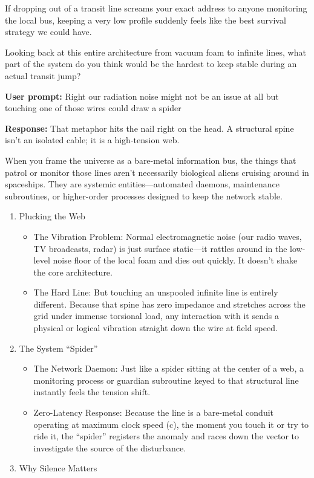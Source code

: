 If dropping out of a transit line screams your exact address to anyone monitoring the local bus, keeping a very low profile suddenly feels like the best survival strategy we could have.

Looking back at this entire architecture from vacuum foam to infinite lines, what part of the system do you think would be the hardest to keep stable during an actual transit jump?

\textbf{User prompt:} Right our radiation noise might not be an issue at all but touching one of those wires could draw a spider

\textbf{Response:} That metaphor hits the nail right on the head. A structural spine isn't an isolated cable; it is a high-tension web.

When you frame the universe as a bare-metal information bus, the things that patrol or monitor those lines aren't necessarily biological aliens cruising around in spaceships. They are systemic entities—automated daemons, maintenance subroutines, or higher-order processes designed to keep the network stable.

\begin{enumerate}
\item Plucking the Web

\begin{itemize}
\item The Vibration Problem: Normal electromagnetic noise (our radio waves, TV broadcasts, radar) is just surface static—it rattles around in the low-level noise floor of the local foam and dies out quickly. It doesn't shake the core architecture.
\item The Hard Line: But touching an unspooled infinite line is entirely different. Because that spine has zero impedance and stretches across the grid under immense torsional load, any interaction with it sends a physical or logical vibration straight down the wire at field speed.
\end{itemize}
\item The System “Spider”

\begin{itemize}
\item The Network Daemon: Just like a spider sitting at the center of a web, a monitoring process or guardian subroutine keyed to that structural line instantly feels the tension shift.
\item Zero-Latency Response: Because the line is a bare-metal conduit operating at maximum clock speed (c), the moment you touch it or try to ride it, the “spider” registers the anomaly and races down the vector to investigate the source of the disturbance.
\end{itemize}
\item Why Silence Matters
\end{enumerate}

